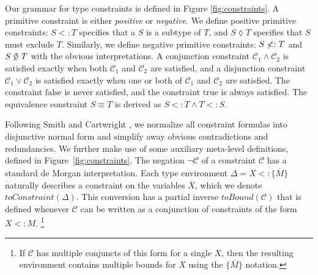 \documentclass[10pt]{sigplanconf}
\renewcommand{\bar}{\overline}
\newcommand{\C}{\mathcal{C}}
\newcommand{\exc}{\mathrel{\lozenge}}
\newcommand{\nexc}{\mathrel{\hbox to 0pt{$\mskip -1.4mu\not$\hss}\lozenge}}
\newcommand{\extends}{\ensuremath{<:}}
\newcommand{\subtypeof}{\ensuremath{<:}}
\newcommand{\nsubtypeof}{\not \subtypeof}
\newcommand{\bd}[1]{\ensuremath{\{\bar{#1}\}}}
\newcommand{\bds}[2]{\ensuremath{\bar{{#1} \extends \bd{#2}}}}
\newcommand{\FALSE}{\textrm{false}}
\newcommand{\TRUE}{\textrm{true}}
\begin{document}
Our grammar for type constraints is defined in Figure \ref{fig:constraints}.
A primitive constraint is either {\it positive} or {\it negative}. We define
positive primitive constraints: $S \subtypeof T$ specifies that
a $S$ is a subtype of $T$, and $S \exc T$ specifies that $S$ must exclude $T$.
Similarly, we define negative primitive constraints: $S \nsubtypeof T$ and $S \nexc T$ with the obvious interpretations.
A conjunction constraint $\C_1 \wedge \C_2$ is satisfied exactly
when both $\C_1$ and $\C_2$ are satisfied,
and a disjunction constraint $\C_1 \vee \C_2$ is satisfied exactly
when one or both of $\C_1$ and $\C_2$ are satisfied.
The constraint $\FALSE$ is never satisfied, and the constraint $\TRUE$ is always satisfied. The equivalence constraint $S \equiv T$ is derived as $S \subtypeof T \wedge T \subtypeof S$.

Following Smith and Cartwright \cite{smith08}, 
we normalize all constraint formulas into disjunctive normal form
and simplify away obvious contradictions and redundancies. We further make use
of some auxiliary meta-level definitions, defined in Figure~\ref{fig:constraints}. 
The negation $\neg \C$ of a constraint $\C$ has a standard de Morgan interpretation.
Each type environment $\Delta = \bds{X}{M}$ naturally describes a constraint
on the variables $\bar{X}$,
which we denote $\textit{toConstraint}(\Delta)$. This conversion
has a partial inverse $\textit{toBound}(\C)$ that is defined whenever $\C$ can be written as a conjunction of constraints of the form $X \subtypeof M$.%
\footnote{If $\C$ has multiple conjuncts of this form for a single $X$, then the resulting environment contains multiple bounds for $X$ using the $\bd{M}$ notation.}
\end{document}
